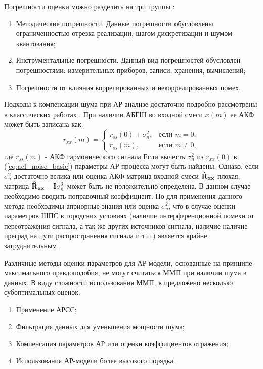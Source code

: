 Погрешности оценки можно разделить на три группы \cite{bolshakov-book}:
\begin{enumerate}
	\item Методические погрешности. Данные погрешности обусловлены ограниченностью отрезка реализации, шагом дискретизации и шумом квантования;
	\item Инструментальные погрешности. Данный вид погрешностей обусловлен погрешностями: измерительных приборов, записи, хранения, вычислений;
	\item Погрешности от влияния коррелированных и некоррелированных помех.
\end{enumerate}

Подходы к компенсации шума при АР анализе достаточно подробно рассмотрены в классических работах \cite{kay_ar_book, kay_noise_compensation}.
При наличии АБГШ во входной смеси ${x(m)}$ ее АКФ может быть записана как:
\begin{equation}
	\label{eq:acf_noise_basic}
	r_{xx}(m) =	\begin{cases}
				r_{ss}(0) + \sigma_n^2, & \mbox{если } m=0; \\
				r_{ss}(m), & \mbox{если } m \ne 0,
			\end{cases}
\end{equation}
где ${r_{ss}(m)}$ - АКФ гармонического сигнала 
Если вычесть ${\sigma_n^2}$ из ${r_{xx}(0)}$ в (\ref{eq:acf_noise_basic}) параметры АР процесса могут быть найдены. Однако, если ${\sigma_n^2}$ достаточно велика или 
оценка АКФ матрица входной смеси ${{\bf{\hat{R}_{xx}}}}$ плохая, матрица ${{\bf{\hat{R}_{xx}}} - {\bf{I}}\sigma_n^2}$ может быть не положительно определена. В данном
случае необходимо вводить поправочный коэффициент. Но для применения данного метода необходимы априорные знания или оценка ${\sigma_n^2}$,
что в случае оценки параметров ШПС в городских условиях (наличие интерференционной помехи от переотражения сигнала, а так же других источников сигнала,
наличие наличие преград на пути распространения сигнала и т.п.) является крайне затруднительным.

Различные методы оценки параметров для АР-модели, основанные на принципе максимального правдоподобия, не
могут считаться ММП при наличии шума в данных. В виду сложности использования ММП, в \cite{marpl_book, kay_ar_book} предложено несколько 
субоптимальных оценок:
\begin{enumerate}
	\item Применение АРСС;
	\item Фильтрация данных для уменьшения мощности шума;
	\item Компенсация параметров АР или оценки коэффициентов отражения;
	\item Использования АР-модели более высокого порядка.
\end{enumerate}

